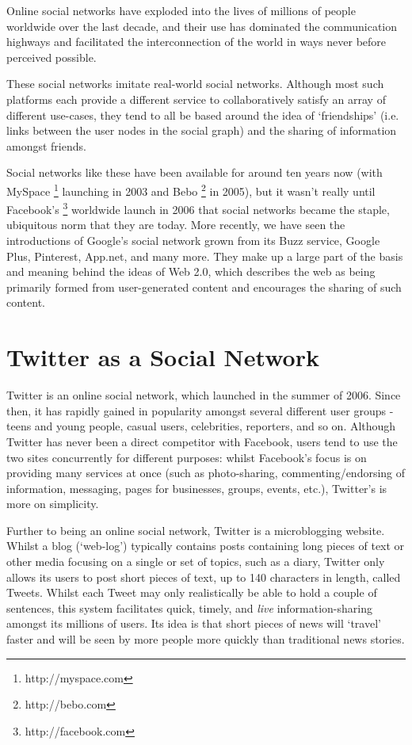 Online social networks have exploded into the lives of millions of people worldwide over the last decade, and their use has dominated the communication highways and facilitated the interconnection of the world in ways never before perceived possible.

These social networks imitate real-world social networks. Although most such platforms each provide a different service to collaboratively satisfy an array of different use-cases, they tend to all be based around the idea of `friendships' (i.e. links between the user nodes in the social graph) and the sharing of information amongst friends.

Social networks like these have been available for around ten years now (with MySpace \footnote{http://myspace.com} launching in 2003 and Bebo \footnote{http://bebo.com} in 2005), but it wasn't really until Facebook's \footnote{http://facebook.com} worldwide launch in 2006 that social networks became the staple, ubiquitous norm that they are today. More recently, we have seen the introductions of Google's social network grown from its Buzz service, Google Plus, Pinterest, App.net, and many more. They make up a large part of the basis and meaning behind the ideas of Web 2.0, which describes the web as being primarily formed from user-generated content and encourages the sharing of such content.


\section{Twitter as a Social Network}
Twitter is an online social network, which launched in the summer of 2006. Since then, it has rapidly gained in popularity amongst several different user groups - teens and young people, casual users, celebrities, reporters, and so on. Although Twitter has never been a direct competitor with Facebook, users tend to use the two sites concurrently for different purposes: whilst Facebook's focus is on providing many services at once (such as photo-sharing, commenting/endorsing of information, messaging, pages for businesses, groups, events, etc.), Twitter's is more on simplicity.

Further to being an online social network, Twitter is a microblogging website. Whilst a blog (`web-log') typically contains posts containing long pieces of text or other media focusing on a single or set of topics, such as  a diary, Twitter only allows its users to post short pieces of text, up to 140 characters in length, called Tweets. Whilst each Tweet may only realistically be able to hold a couple of sentences, this system facilitates quick, timely, and \textit{live} information-sharing amongst its millions of users. Its idea is that short pieces of news will `travel' faster and will be seen by more people more quickly than traditional news stories.

